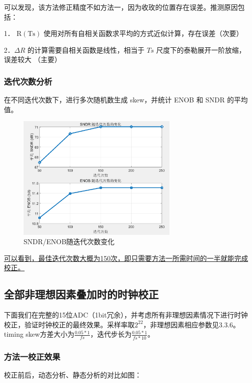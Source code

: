 \documentclass[cs4size,a4paper]{ctexart}
\numberwithin{equation}{section}
\numberwithin{table}{section}
\numberwithin{figure}{section}
\begin{document}
		可以发现，该方法修正精度不如方法一，因为收玫的位置存在误差。推测原因包括：
		
		1． $\mathrm{R}(\mathrm{Ts})$ 使用对所有自相关函数求平均的方式近似计算，存在误差（次要）
		
		2．$\Delta R$ 的计算需要自相关函数是线性，相当于 $T s$ 尺度下的泰勒展开一阶放缩，误差较大 （主要）
			
		
		\subsubsection{迭代次数分析}
		在不同迭代次数下，进行多次随机数生成 skew，并统计 ENOB 和 SNDR 的平均值。
		
		\begin{figure}[H]
			\centering
			\includegraphics[width=0.7\textwidth]{figure/cor6.png}
			\caption{SNDR/ENOB随迭代次数变化} 
			\label{fig:cor6}
		\end{figure}
		
		\underline{可以看到，最佳迭代次数大概为150次，即只需要方法一所需时间的一半就能完成校正。}

		\subsection{全部非理想因素叠加时的时钟校正}
		下面我们在完整的15位ADC（1bit冗余），并考虑所有非理想因素情况下进行时钟校正，验证时钟校正的最终效果。采样率取$2^22$，非理想因素相应参数见3.3.6。timing skew方差大小为$\frac{0.05*1}{fs}$，迭代步长为$\frac{0.05*1}{fs*10}$。

		\subsubsection{方法一校正效果}

		校正前后，动态分析、静态分析的对比如图：
\end{document}
